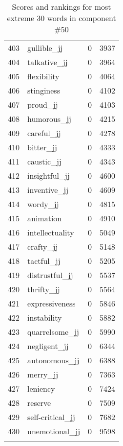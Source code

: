 \begin{longtable}[!htbp]{| rlr@{.}l |}
    403 & gullible\_jj & 0 & 3937 \\
    404 & talkative\_jj & 0 & 3964 \\
    405 & flexibility & 0 & 4064 \\
    406 & stinginess & 0 & 4102 \\
    407 & proud\_jj & 0 & 4103 \\
    408 & humorous\_jj & 0 & 4215 \\
    409 & careful\_jj & 0 & 4278 \\
    410 & bitter\_jj & 0 & 4333 \\
    411 & caustic\_jj & 0 & 4343 \\
    412 & insightful\_jj & 0 & 4600 \\
    413 & inventive\_jj & 0 & 4609 \\
    414 & wordy\_jj & 0 & 4815 \\
    415 & animation & 0 & 4910 \\
    416 & intellectuality & 0 & 5049 \\
    417 & crafty\_jj & 0 & 5148 \\
    418 & tactful\_jj & 0 & 5205 \\
    419 & distrustful\_jj & 0 & 5537 \\
    420 & thrifty\_jj & 0 & 5564 \\
    421 & expressiveness & 0 & 5846 \\
    422 & instability & 0 & 5882 \\
    423 & quarrelsome\_jj & 0 & 5990 \\
    424 & negligent\_jj & 0 & 6344 \\
    425 & autonomous\_jj & 0 & 6388 \\
    426 & merry\_jj & 0 & 7363 \\
    427 & leniency & 0 & 7424 \\
    428 & reserve & 0 & 7509 \\
    429 & self-critical\_jj & 0 & 7682 \\
    430 & unemotional\_jj & 0 & 9598 \\
    \hline
    \caption{Scores and rankings for most extreme 30 words in component \#50} \\
\end{longtable}
